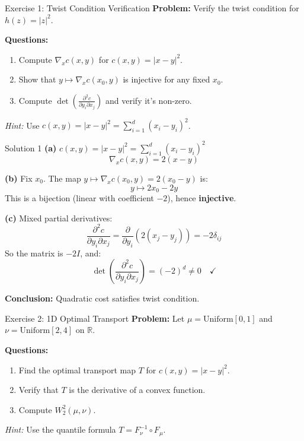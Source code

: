 \documentclass[aspectratio=169]{beamer}
\newcommand{\R}{\mathbb{R}}
\begin{document}
\begin{frame}{Exercise 1: Twist Condition Verification}
\textbf{Problem:} Verify the twist condition for $h(z) = |z|^2$.

\vspace{0.3cm}
\textbf{Questions:}
\begin{enumerate}
    \item[(a)] Compute $\nabla_x c(x,y)$ for $c(x,y) = |x-y|^2$.
    \item[(b)] Show that $y \mapsto \nabla_x c(x_0, y)$ is injective for any fixed $x_0$.
    \item[(c)] Compute $\det\left(\frac{\partial^2 c}{\partial y_i \partial x_j}\right)$ and verify it's non-zero.
\end{enumerate}

\vspace{0.5cm}
\textit{Hint:} Use $c(x,y) = |x-y|^2 = \sum_{i=1}^d (x_i - y_i)^2$.
\end{frame}

\begin{frame}{Solution 1}
\textbf{(a)} $c(x,y) = |x-y|^2 = \sum_{i=1}^d (x_i - y_i)^2$
\[
\nabla_x c(x,y) = 2(x - y)
\]

\vspace{0.2cm}
\textbf{(b)} Fix $x_0$. The map $y \mapsto \nabla_x c(x_0, y) = 2(x_0 - y)$ is:
\[
y \mapsto 2x_0 - 2y
\]
This is a bijection (linear with coefficient $-2$), hence \textbf{injective}. \checkmark

\vspace{0.2cm}
\textbf{(c)} Mixed partial derivatives:
\[
\frac{\partial^2 c}{\partial y_i \partial x_j} = \frac{\partial}{\partial y_i}(2(x_j - y_j)) = -2\delta_{ij}
\]
So the matrix is $-2I$, and:
\[
\det\left(\frac{\partial^2 c}{\partial y_i \partial x_j}\right) = (-2)^d \neq 0 \quad \checkmark
\]

\textbf{Conclusion:} Quadratic cost satisfies twist condition.
\end{frame}

\begin{frame}{Exercise 2: 1D Optimal Transport}
\textbf{Problem:} Let $\mu = \text{Uniform}[0,1]$ and $\nu = \text{Uniform}[2,4]$ on $\R$.

\vspace{0.3cm}
\textbf{Questions:}
\begin{enumerate}
    \item[(a)] Find the optimal transport map $T$ for $c(x,y) = |x-y|^2$.
    \item[(b)] Verify that $T$ is the derivative of a convex function.
    \item[(c)] Compute $W_2^2(\mu, \nu)$.
\end{enumerate}

\vspace{0.5cm}
\textit{Hint:} Use the quantile formula $T = F_\nu^{-1} \circ F_\mu$.
\end{frame}
\end{document}
